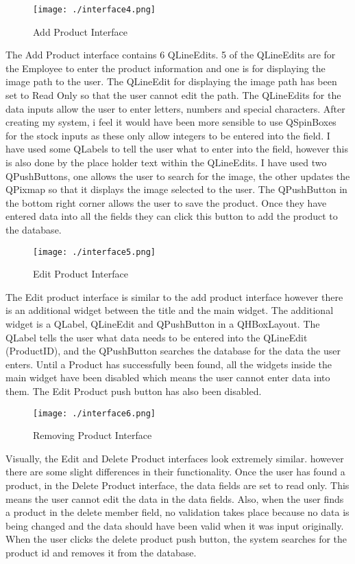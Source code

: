 \begin{figure}[H]
    \texttt{[image: ./interface4.png]}
    \caption{Add Product Interface} \label{fig:add-product-interface}
\end{figure}

The Add Product interface contains 6 QLineEdits. 5 of the QLineEdits are for the Employee to enter the product information and one is for displaying the image path to the user. The QLineEdit for displaying the image path has been set to Read Only so that the user cannot edit the path. The QLineEdits for the data inputs allow the user to enter letters, numbers and special characters. After creating my system, i feel it would have been more sensible to use QSpinBoxes for the stock inputs as these only allow integers to be entered into the field. I have used some QLabels to tell the user what to enter into the field, however this is also done by the place holder text within the QLineEdits. I have used two QPushButtons, one allows the user to search for the image, the other updates the QPixmap so that it displays the image selected to the user. The QPushButton in the bottom right corner allows the user to save the product. Once they have entered data into all the fields they can click this button to add the product to the database.


\begin{figure}[H]
    \texttt{[image: ./interface5.png]}
    \caption{Edit Product Interface} \label{fig:edit-product-interface}
\end{figure}

The Edit product interface is similar to the add product interface however there is an additional widget between the title and the main widget. The additional widget is a QLabel, QLineEdit and QPushButton in a QHBoxLayout. The QLabel tells the user what data needs to be entered into the QLineEdit (ProductID), and the QPushButton searches the database for the data the user enters. Until a Product has successfully been found, all the widgets inside the main widget have been disabled which means the user cannot enter data into them. The Edit Product push button has also been disabled.
\begin{figure}[H]
    \texttt{[image: ./interface6.png]}
    \caption{Removing Product Interface} \label{fig:removing-product-interface}
\end{figure}

Visually, the Edit and Delete Product interfaces look extremely similar. however there are some slight differences in their functionality. Once the user has found a product, in the Delete Product interface, the data fields are set to read only. This means the user cannot edit the data in the data fields. Also, when the user finds a product in the delete member field, no validation takes place because no data is being changed and the data should have been valid when it was input originally. When the user clicks the delete product push button, the system searches for the product id and removes it from the database.

